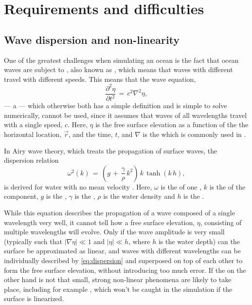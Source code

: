 \chapter{Requirements and difficulties}
\label{chap:requirementsanddifficulties}

\section{Wave dispersion and non-linearity}

One of the greatest challenges when simulating an ocean is the fact that ocean waves are subject to , also known as , which means that waves with different \wavelengths travel with different speeds. This means that the wave equation,
%
\begin{equation} \label{eq:wave_equation}
\frac{\partial^2 \eta}{\partial t^2} \,=\, c^2\nabla^2\eta,
\end{equation}
%
--- a \PDE\xspace --- which otherwise both has a simple definition and is simple to solve numerically, cannot be used, since it assumes that waves of all wavelengths travel with a single speed, $c$. Here, $\eta$ is the free surface elevation as a function of the the horizontal location, $\vec{r}$, and the time, $t$, and $\nabla$ is the  which is commonly used in .

In Airy wave theory, which treats the propagation of surface waves, the dispersion relation
%
\begin{equation} \label{eq:dispersion}
\omega^2(k) \,=\, \left(g\,+\,\frac{\gamma}{\rho}\,k^2\right)\,k\,\tanh(k\,h),
\end{equation}
%
is derived for water with no mean velocity \citep{Phillip1977}. Here, $\omega$ is the  of one , $k$ is the  of the component, $g$ is the , $\gamma$ is the , $\rho$ is the water density and $h$ is the .

While this equation describes the propagation of a wave composed of a single wavelength very well, it cannot tell how a free surface elevation, $\eta$, consisting of multiple wavelengths will evolve. Only if the wave amplitude is very small (typically such that $|\nabla\eta| \ll 1$ and $|\eta| \ll h$, where $h$ is the water depth) can the surface be approximated as linear, and waves with different wavelengths can be individually described by \eqref{eq:dispersion} and superposed on top of each other to form the free surface elevation, without introducing too much error. If the  on the other hand is not that small, strong non-linear phenomena are likely to take place, including for example , which won't be caught in the simulation if the surface is linearized.


